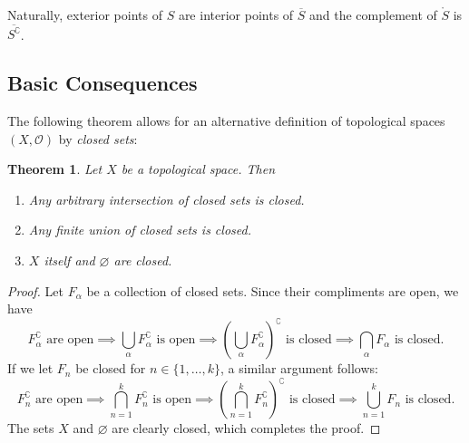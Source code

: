 \documentclass[11pt]{article}
\newtheorem{theorem}{Theorem}
\renewcommand{\O}{\mathcal{O}}
\begin{document}
Naturally, exterior points of $S$ are interior points of $\overline{S}$ and the complement of $\mathring{S}$ is $\overline{S^{\complement}}$.


\subsection{Basic Consequences}

The following theorem allows for an alternative definition of topological spaces $(X, \O)$ by \textit{closed sets}:

\begin{theorem}
  Let $X$ be a topological space. Then
  \begin{enumerate}
    \item Any arbitrary intersection of closed sets is closed.
    \item Any finite union of closed sets is closed.
    \item $X$ itself and $\varnothing$ are closed.
  \end{enumerate}
\end{theorem}
\begin{adjustwidth}{0.5cm}{}
  \begin{proof}
    Let $F_{\alpha}$ be a collection of closed sets. Since their compliments are open, we have
    \[
      F_{\alpha}^{\complement} \text{ are open} \implies \bigcup\limits_{\alpha} F_{\alpha}^{\complement} \text{ is open} \implies \left( \bigcup\limits_{\alpha} F_{\alpha}^{\complement} \right)^{\complement} \text{ is closed} \implies \bigcap\limits_{\alpha} F_{\alpha} \text{ is closed}.
    \]
    If we let $F_{n}$ be closed for $n \in \{ 1, \ldots, k \}$, a similar argument follows:
    \[
      F_{n}^{\complement} \text{ are open} \implies \bigcap\limits_{n = 1}^{k} F_{n}^{\complement} \text{ is open} \implies \left( \bigcap\limits_{n = 1}^{k} F_{n}^{\complement} \right)^{\complement} \text{ is closed} \implies \bigcup\limits_{n = 1}^{k} F_{n} \text{ is closed}.
    \]
    The sets $X$ and $\varnothing$ are clearly closed, which completes the proof. 
  \end{proof}
\end{adjustwidth}
\end{document}
